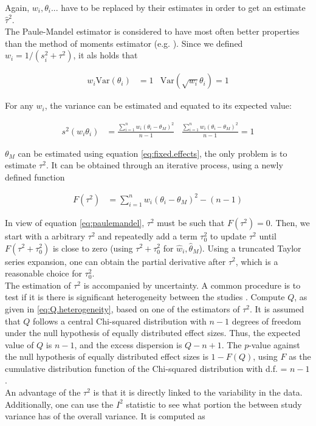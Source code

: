 Again, $w_i, \theta_i ...$ have to be replaced by their estimates in order to get an estimate $\hat{\tau}^2$. \\
The Paule-Mandel estimator \citep{paulemandel} is considered to have most often better properties than the method of moments estimator (e.g. \citet{tau.estimator.evaluation}).
Since we defined $w_i = 1/(s_i^2 + \tau^2)$, it als holds that

\begin{align}
w_i \textrm{Var}(\theta_i) &= 1 & \textrm{Var}(\sqrt{w_i}\theta_i) = 1 \nonumber
\end{align}

For any $w_i$, the variance can be estimated and equated to its expected value:

\begin{align}
s^2(w_i\theta_i) &= \frac{\sum_{i = 1}^n w_i(\theta_i - \theta_M)^2}{n-1} & \frac{\sum_{i = 1}^n w_i(\theta_i - \theta_M)^2}{n-1} = 1 \label{eq:paulemandel}
\end{align}

$\theta_M$ can be estimated using equation \ref{eq:fixed.effects}, the only problem is to estimate $\tau^2$. It can be obtained through an iterative process, using a newly defined function

\begin{align}
F(\tau^2) &= \sum_{i = 1}^n w_i(\theta_i - \theta_M)^2 - (n-1) \nonumber
\end{align}

In view of equation \ref{eq:paulemandel}, $\tau^2$ must be such that $F(\tau^2) = 0$. Then, we start with a arbitrary $\tau^2$ and repeatedly add a term $\tau_0^2$ to update $\tau^2$ until $F(\tau^2 + \tau_0^2)$ is close to zero (using $\tau^2 + \tau_0^2$ for $\hat{w}_i, \hat{\theta}_M$). Using a truncated Taylor series expansion, one can obtain the partial derivative after $\tau^2$, which is a reasonable choice for $\tau_0^2$. \\
The estimation of $\tau^2$ is accompanied by uncertainty. A common procedure is to test if it is there is significant heterogeneity between the studies \cite[109]{Intro.meta}. Compute $Q$, as given in \ref{eq:Q.heterogeneity}, based on one of the estimators of $\tau^2$. It is assumed that $Q$ follows a central Chi-squared distribution with $n -1$ degrees of freedom under the null hypothesis of equally distributed effect sizes. Thus, the expected value of $Q$ is $n-1$, and the excess dispersion is $Q - n + 1$. The $p$-value against the null hypothesis of equally distributed effect sizes is $1 - F(Q)$, using $F$ as the cumulative distribution function of the Chi-squared distribution with d.f. = $n-1$. \\
An advantage of the $\tau^2$ is that it is directly linked to the variability in the data. Additionally, one can use the $I^2$ statistic to see what portion the between study variance has of the overall variance. It is computed as

